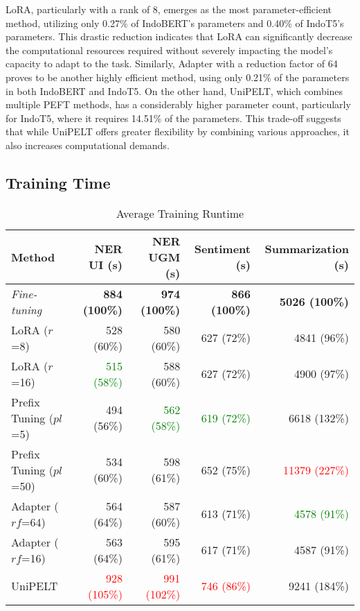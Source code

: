 LoRA, particularly with a rank of 8, emerges as the most parameter-efficient method, utilizing only 0.27\% of IndoBERT's parameters and 0.40\% of IndoT5's parameters. This drastic reduction indicates that LoRA can significantly decrease the computational resources required without severely impacting the model's capacity to adapt to the task. Similarly, Adapter with a reduction factor of 64 proves to be another highly efficient method, using only 0.21\% of the parameters in both IndoBERT and IndoT5. On the other hand, UniPELT, which combines multiple PEFT methods, has a considerably higher parameter count, particularly for IndoT5, where it requires 14.51\% of the parameters. This trade-off suggests that while UniPELT offers greater flexibility by combining various approaches, it also increases computational demands.

\subsection{Training Time}

\begin{table*}[!ht]
    \centering
    \caption{Average Training Runtime}
    \label{table:runtime}
    \begin{tabular}{l|r|r|r|r}
        \toprule
        \textbf{Method} & \textbf{NER UI (s)} & \textbf{NER UGM (s)} & \textbf{Sentiment (s)} & \textbf{Summarization (s)} \\
        \midrule
        \textit{Fine-tuning} & \textbf{884 (100\%)} & \textbf{974 (100\%)} & \textbf{866 (100\%)} & \textbf{5026 (100\%)} \\
        LoRA ($r$=8) & 528 (60\%) & 580 (60\%) & 627 (72\%) & 4841 (96\%) \\
        LoRA ($r$=16) & \textcolor{Green}{515 (58\%)} & 588 (60\%) & 627 (72\%) & 4900 (97\%) \\
        Prefix Tuning ($pl$=5) & 494 (56\%) & \textcolor{Green}{562 (58\%)} & \textcolor{Green}{619 (72\%)} & 6618 (132\%) \\
        Prefix Tuning ($pl$=50) & 534 (60\%) & 598 (61\%) & 652 (75\%) & \textcolor{Red}{11379 (227\%)} \\
        Adapter ($rf$=64) & 564 (64\%) & 587 (60\%) & {613 (71\%)} & \textcolor{Green}{4578 (91\%)} \\
        Adapter ($rf$=16) & 563 (64\%) & 595 (61\%) & 617 (71\%) & 4587 (91\%) \\
        UniPELT & \textcolor{Red}{928 (105\%)} & \textcolor{Red}{991 (102\%)} & \textcolor{Red}{746 (86\%)} & 9241 (184\%) \\
        \bottomrule
    \end{tabular}
\end{table*}


